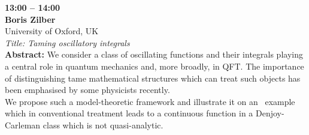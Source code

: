 \documentclass[10pt,a4paper]{article}
\begin{document}
\begin{tcolorbox}[talkbox]
\textbf{13:00 -- 14:00} \\
\textbf{Boris Zilber} \\
University of Oxford, UK \\
\textit{Title: Taming oscillatory integrals} \\
\textbf{Abstract:} We consider a class of oscillating functions and their integrals  playing a central role in quantum mechanics and, more broadly, in QFT. The importance of distinguishing tame mathematical structures which can treat such objects has been emphasised by some physicists recently.\\

We propose such a model-theoretic framework and illustrate it on an  example which in conventional treatment leads to a continuous function in a Denjoy-Carleman class which is not quasi-analytic.  
\end{tcolorbox}
\end{document}
